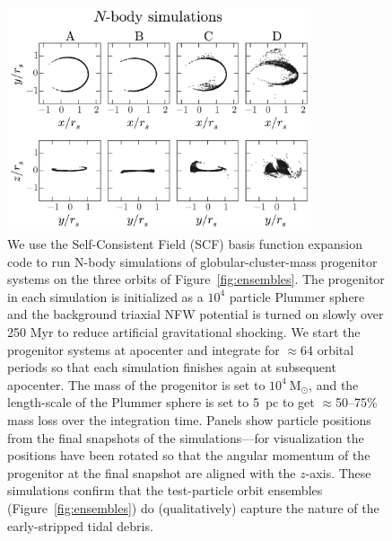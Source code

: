 \documentclass{mn2e}
\newcommand{\msun}{\ensuremath{\mathrm{M}_\odot}}
\begin{document}
\begin{figure}[h]%
\begin{center}
\includegraphics[width=0.8\textwidth]{figures/nbody.pdf}
\caption{ We use the Self-Consistent Field (SCF) basis function expansion code \citep{hernquist92} to run N-body simulations of globular-cluster-mass progenitor systems on the three orbits of Figure~\ref{fig:ensembles}. The progenitor in each simulation is initialized as a $10^4$ particle Plummer sphere and the background triaxial NFW potential is turned on slowly over 250 Myr to reduce artificial gravitational shocking. We start the progenitor systems at apocenter and integrate for $\approx$64 orbital periods so that each simulation finishes again at subsequent apocenter. The mass of the progenitor is set to $10^4~\msun$, and the length-scale of the Plummer sphere is set to 5~pc to get $\approx$50--75\% mass loss over the integration time. Panels show particle positions from the final snapshots of the simulations---for visualization the positions have been rotated so that the angular momentum of the progenitor at the final snapshot are aligned with the $z$-axis. These simulations confirm that the test-particle orbit ensembles (Figure~\ref{fig:ensembles}) do (qualitatively) capture the nature of the early-stripped tidal debris. }
\label{fig:nbodysims}
\end{center}
\end{figure}
\end{document}
